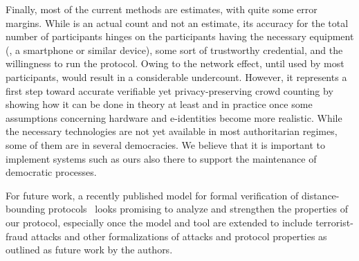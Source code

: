 Finally, most of the current methods are estimates, with quite some error margins. 
While \PRIVO is an actual count and not an estimate, its accuracy for the total number of participants hinges on the participants having the necessary equipment (\ie, a smartphone or similar device), some sort of trustworthy credential, and the willingness to run the protocol. 
Owing to the network effect, until used by most participants, \PRIVO would result in a considerable undercount. 
However, it represents a first step toward accurate verifiable yet privacy-preserving crowd counting by showing how it can be done in theory at least and in practice once some assumptions concerning hardware and e-identities become more realistic. 
While the necessary technologies are not yet available in most authoritarian regimes, some of them are in several democracies. We believe that it is important to implement systems such as ours also there to support the maintenance of democratic processes.

For future work, a recently published model for formal verification of distance-bounding protocols~\cite{TamarinDB} looks promising to analyze and strengthen the properties of our protocol, especially once the model and tool are extended to include terrorist-fraud attacks and other formalizations of attacks and protocol properties as outlined as future work by the authors.

